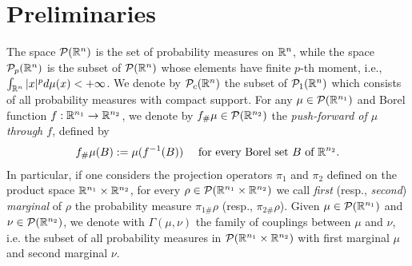 
\section{Preliminaries}\label{meanfield}


The space $\mathcal{P}(\mathbb{R}^n)$ is the set of probability measures on $\mathbb{R}^n$, while the space %
$\mathcal{P}_p(\mathbb{R}^n)$ is the subset of $\mathcal{P}(\mathbb{R}^n)$ whose elements have finite $p$-th moment, i.e.,
$\int_{\mathbb{R}^n} |x|^p d\mu(x) < +\infty$.
We denote by $\mathcal{P}_c(\mathbb{R}^n)$ the subset of $\mathcal{P}_1(\mathbb{R}^n)$ which consists of all probability measures with compact support. %
For any $\mu \in \mathcal{P}(\mathbb{R}^{n_1})$ and Borel function $f: \mathbb{R}^{n_1} \to \mathbb{R}^{n_2}$, we denote by $f_{\#}\mu \in \mathcal{P}(\mathbb{R}^{n_2})$ the {\it push-forward of $\mu$ through $f$}, defined by
\begin{align*}
f_{\#}\mu(B) := \mu(f^{-1}(B)) \quad \text{ for every Borel set } B \text{ of } \mathbb{R}^{n_2}.
\end{align*}
In particular, if one considers the projection operators $\pi_1$ and $\pi_2$ defined on the product space $\mathbb{R}^{n_1} \times \mathbb{R}^{n_2}$, for every $\rho \in \mathcal{P}(\mathbb{R}^{n_1} \times \mathbb{R}^{n_2})$ we call {\it first} (resp., {\it second}) {\it marginal} of $\rho$ the probability measure $\pi_{1\#}\rho$ (resp., $\pi_{2\#}\rho$). Given $\mu \in \mathcal{P}(\mathbb{R}^{n_1})$ and $\nu \in \mathcal{P}(\mathbb{R}^{n_2})$, we denote with $\Gamma(\mu, \nu)$ the family of couplings between $\mu$ and $\nu$, i.e. the subset of all probability measures in $\mathcal{P}(\mathbb{R}^{n_1} \times \mathbb{R}^{n_2})$ with first marginal $\mu$ and second marginal $\nu$.

